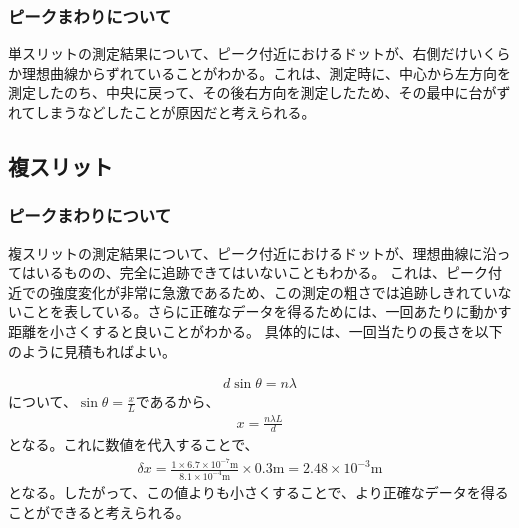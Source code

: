 \documentclass[a4paper,11pt]{jsarticle}
\begin{document}
\subsubsection{ピークまわりについて}
単スリットの測定結果について、ピーク付近におけるドットが、右側だけいくらか理想曲線からずれていることがわかる。これは、測定時に、中心から左方向を測定したのち、中央に戻って、その後右方向を測定したため、その最中に台がずれてしまうなどしたことが原因だと考えられる。\\

\subsection{複スリット}
\subsubsection{ピークまわりについて}
複スリットの測定結果について、ピーク付近におけるドットが、理想曲線に沿ってはいるものの、完全に追跡できてはいないこともわかる。
これは、ピーク付近での強度変化が非常に急激であるため、この測定の粗さでは追跡しきれていないことを表している。さらに正確なデータを得るためには、一回あたりに動かす距離を小さくすると良いことがわかる。
具体的には、一回当たりの長さを以下のように見積もればよい。

\begin{align}
  d\sin\theta = n\lambda
\end{align}
について、$\sin\theta = \frac{x}{L}$であるから、
\begin{align}
  x = \frac{n\lambda L}{d}
\end{align}
となる。これに数値を代入することで、
\begin{align}
  \delta x = \frac{1 \times 6.7 \times 10^{-7} \si{\meter}}{8.1 \times 10^{-4}\si{\meter}} \times 0.3\si{\meter} = 2.48 \times 10^{-3} \si{\meter}
\end{align}
となる。したがって、この値よりも小さくすることで、より正確なデータを得ることができると考えられる。
\end{document}
